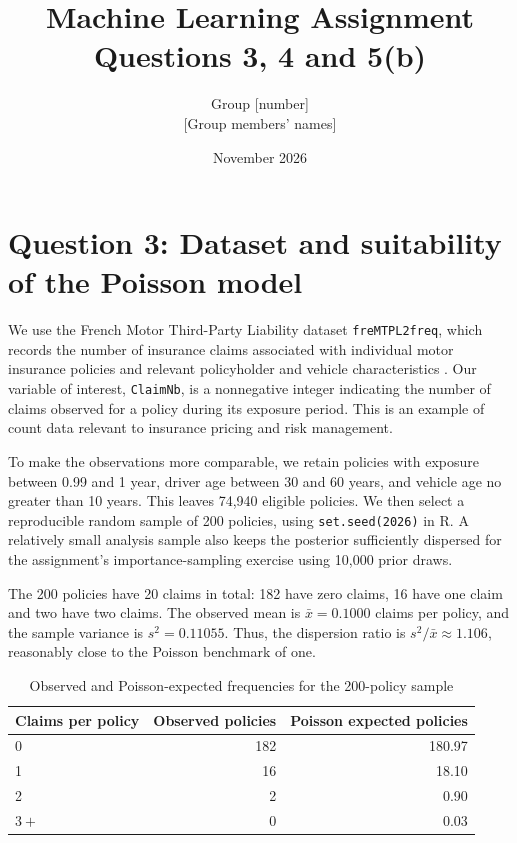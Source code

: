 \documentclass[11pt,a4paper]{article}
\title{Machine Learning Assignment\\\large Questions 3, 4 and 5(b)}
\author{Group [number]\\[2pt] [Group members' names]}
\date{November 2026}
\begin{document}
\maketitle

\section*{Question 3: Dataset and suitability of the Poisson model}

We use the French Motor Third-Party Liability dataset \texttt{freMTPL2freq}, which records the number of insurance claims associated with individual motor insurance policies and relevant policyholder and vehicle characteristics \cite{CASdatasets,HuggingFace}. Our variable of interest, \texttt{ClaimNb}, is a nonnegative integer indicating the number of claims observed for a policy during its exposure period. This is an example of count data relevant to insurance pricing and risk management.

To make the observations more comparable, we retain policies with exposure between 0.99 and 1 year, driver age between 30 and 60 years, and vehicle age no greater than 10 years. This leaves 74,940 eligible policies. We then select a reproducible random sample of 200 policies, using \texttt{set.seed(2026)} in R. A relatively small analysis sample also keeps the posterior sufficiently dispersed for the assignment's importance-sampling exercise using 10,000 prior draws.

The 200 policies have 20 claims in total: 182 have zero claims, 16 have one claim and two have two claims. The observed mean is $\bar{x}=0.1000$ claims per policy, and the sample variance is $s^2=0.11055$. Thus, the dispersion ratio is $s^2/\bar{x}\approx1.106$, reasonably close to the Poisson benchmark of one.

\begin{table}[ht]
\centering
\caption{Observed and Poisson-expected frequencies for the 200-policy sample}
\label{tab:claim_frequencies}
\begin{tabular}{lrr}
\toprule
Claims per policy & Observed policies & Poisson expected policies \\
\midrule
0 & 182 & 180.97 \\
1 & 16 & 18.10 \\
2 & 2 & 0.90 \\
$3+$ & 0 & 0.03 \\
\bottomrule
\end{tabular}
\end{table}
\end{document}
